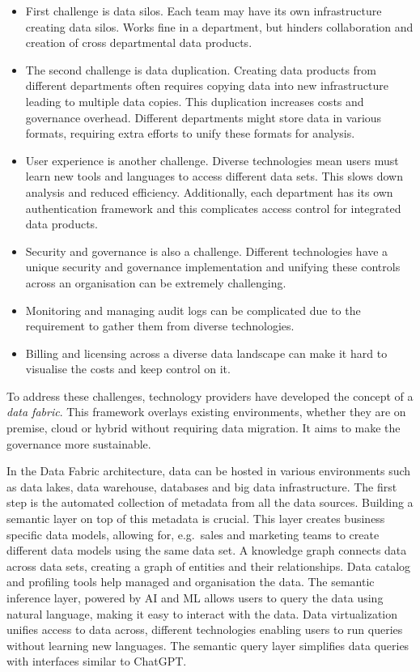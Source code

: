 \begin{itemize}
    \item First challenge is data silos. Each team may have its own infrastructure creating data silos. Works fine in a department, but hinders collaboration and creation of cross departmental data products.
    \item The second challenge is data duplication. Creating data products from different departments often requires copying data into new infrastructure leading to multiple data copies. This duplication increases costs and governance overhead. Different departments might store data in various formats, requiring extra efforts to unify these formats for analysis.
    \item User experience is another challenge. Diverse technologies mean users must learn new tools and languages to access different data sets. This slows down analysis and reduced efficiency. Additionally, each department has its own authentication framework and this complicates access control for integrated data products.
    \item Security and governance is also a challenge. Different technologies have a unique security and governance implementation and unifying these controls across an organisation can be extremely challenging.
    \item Monitoring and managing audit logs can be complicated due to the requirement to gather them from diverse technologies.
    \item Billing and licensing across a diverse data landscape can make it hard to visualise the costs and keep control on it.
\end{itemize}

To address these challenges, technology providers have developed the concept of a \textit{data fabric}.
This framework overlays existing environments, whether they are on premise, cloud or hybrid without requiring data migration.
It aims to make the governance more sustainable.

In the Data Fabric architecture, data can be hosted in various environments such as data lakes, data warehouse, databases and big data infrastructure.
The first step is the automated collection of metadata from all the data sources.
Building a semantic layer on top of this metadata is crucial.
This layer creates business specific data models, allowing for, e.g.\ sales and marketing teams to create different data models using the same data set.
A knowledge graph connects data across data sets, creating a graph of entities and their relationships.
Data catalog and profiling tools help managed and organisation the data.
The semantic inference layer, powered by AI and ML allows users to query the data using natural language, making it easy to interact with the data.
Data virtualization unifies access to data across, different technologies enabling users to run queries without learning new languages.
The semantic query layer simplifies data queries with interfaces similar to ChatGPT\@.

